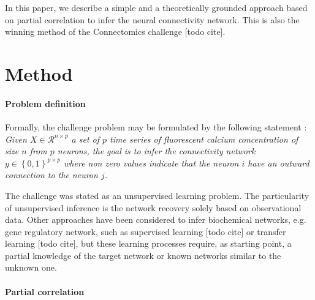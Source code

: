 \documentclass[wcp]{jmlr}
\begin{document}
In this paper, we describe a simple and a theoretically grounded approach
based on partial correlation to infer the neural connectivity network.
This is also the winning method of the Connectomics challenge [todo cite].

\section{Method}

\paragraph{Problem definition\\}


Formally, the challenge problem may be formulated by the following statement : 
\textit{Given $X \in \mathcal{R}^{n \times p}$  a set of $p$ time series of fluorescent
calcium concentration of size $n$ from $p$ neurons, the goal is to infer the
connectivity network $y \in \left\{0, 1\right\}^{p \times p}$ where
non zero values indicate that the neuron $i$ have an outward connection to
the neuron $j$.}


The challenge was stated as an unsupervised learning problem. The particularity of unsupervised inference is the network recovery solely based on observational data. Other approaches have been considered to infer biochemical networks, e.g. gene regulatory network, such as supervised learning [todo cite] or transfer learning [todo cite], but these learning processes require, as starting point, a partial knowledge of the target network or known networks similar to the unknown one. 

\paragraph{Partial correlation\\}
\end{document}
